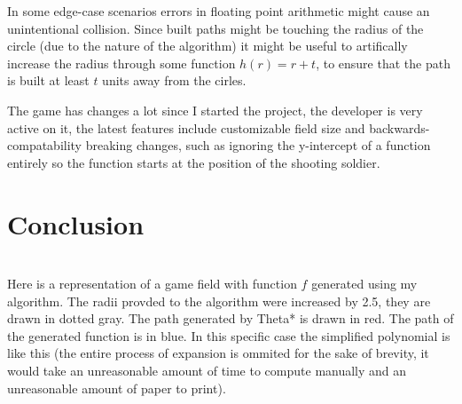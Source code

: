 \documentclass[12pt, titlepage]{article}
\begin{document}
In some edge-case scenarios errors in floating point arithmetic might 
cause an unintentional collision. Since built paths might be touching 
the radius of the circle (due to the nature of the algorithm) it might be
useful to artifically increase the radius through some function $h(r) = r + t$,
to ensure that the path is built at least $t$ units away from the cirles.

The game has changes a lot since I started the project, the developer 
is very active on it, the latest features include customizable 
field size and backwards-compatability breaking changes, such as ignoring the 
y-intercept of a function entirely so the function starts at the position
of the shooting soldier.

\section{Conclusion}

\begin{center}
\\
Here is a representation of a game field with function $f$ generated using my
algorithm. The radii provded to the algorithm were increased by 2.5,
they are drawn in dotted gray. The path generated by Theta* is drawn in red.
The path of the generated function is in blue. In this specific case
the simplified polynomial is like this (the entire process of expansion
is ommited for the sake of brevity, it  would take an unreasonable amount 
of time to compute manually and an unreasonable amount of paper to print).
\end{center}
\end{document}
